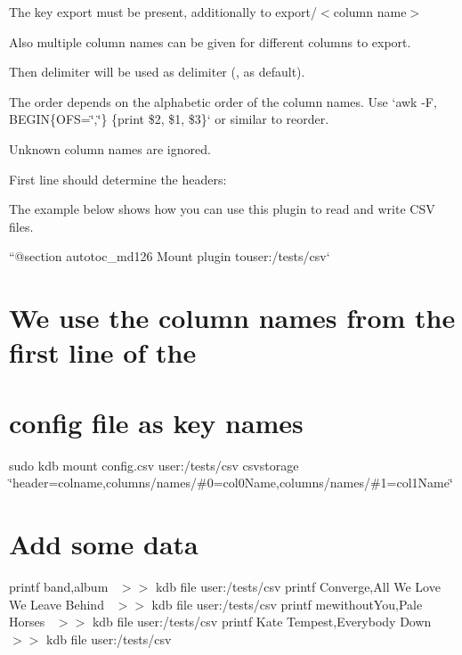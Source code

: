 \begin{DoxyItemize}
\item The key {\ttfamily export} must be present, additionally to {\ttfamily export/$<$column name$>$}
\item Also multiple column names can be given for different columns to export.
\begin{DoxyItemize}
\item Then {\ttfamily delimiter} will be used as delimiter ({\ttfamily ,} as default).
\item The order depends on the alphabetic order of the column names. Use `awk -\/F\textquotesingle{},\textquotesingle{} \textquotesingle{}B\+E\+G\+IN\{O\+FS=\char`\"{},\char`\"{}\} \{print \$2, \$1, \$3\}\textquotesingle{}` or similar to reorder.
\item Unknown column names are ignored.
\end{DoxyItemize}
\end{DoxyItemize}

First line should determine the headers\+:




The example below shows how you can use this plugin to read and write C\+SV files.

``{\ttfamily  @section autotoc\+\_\+md126 Mount plugin to}user\+:/tests/csv` \hypertarget{autotoc_md122_autotoc_md127}{}\section{We use the column names from the first line of the}\label{autotoc_md122_autotoc_md127}
\hypertarget{autotoc_md122_autotoc_md128}{}\section{config file as key names}\label{autotoc_md122_autotoc_md128}
sudo kdb mount config.\+csv user\+:/tests/csv csvstorage \char`\"{}header=colname,columns/names/\#0=col0\+Name,columns/names/\#1=col1\+Name\char`\"{}\hypertarget{autotoc_md122_autotoc_md129}{}\section{Add some data}\label{autotoc_md122_autotoc_md129}
printf \textquotesingle{}band,album~\newline
\textquotesingle{} $>$$>$ {\ttfamily kdb file user\+:/tests/csv} printf \textquotesingle{}Converge,All We Love We Leave Behind~\newline
\textquotesingle{} $>$$>$ {\ttfamily kdb file user\+:/tests/csv} printf \textquotesingle{}mewithout\+You,Pale Horses~\newline
\textquotesingle{} $>$$>$ {\ttfamily kdb file user\+:/tests/csv} printf \textquotesingle{}Kate Tempest,Everybody Down~\newline
\textquotesingle{} $>$$>$ {\ttfamily kdb file user\+:/tests/csv}

